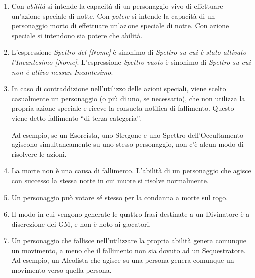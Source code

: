 \documentclass[a4paper,10pt]{article}
\begin{document}
\begin{enumerate}
	
	\item Con \emph{abilità} si intende la capacità di un personaggio vivo di effettuare un'azione speciale di notte. Con \emph{potere} si intende la capacità di un personaggio morto di effettuare un'azione speciale di notte. Con azione speciale si intendono sia potere che abilità.
	
	\item L'espressione \emph{Spettro del [Nome]} è sinonimo di \emph{Spettro su cui è stato attivato l'Incantesimo [Nome]}. L'espressione \emph{Spettro vuoto} è sinonimo di \emph{Spettro su cui non è attivo nessun Incantesimo}.
	
	\item In caso di contraddizione nell'utilizzo delle azioni speciali, viene scelto casualmente un personaggio (o più di uno, se necessario), che non utilizza la propria azione speciale e riceve la consueta notifica di fallimento. Questo viene detto fallimento ``di terza categoria''.
 
	Ad esempio, se un Esorcista, uno Stregone e uno Spettro dell'Occultamento agiscono simultaneamente su uno stesso personaggio, non c'è alcun modo di risolvere le azioni.
	
	\item La morte non è una causa di fallimento. L'abilità di un personaggio che agisce con successo la stessa notte in cui muore si risolve normalmente.
	
	\item Un personaggio può votare sé stesso per la condanna a morte sul rogo.
	
	\item Il modo in cui vengono generate le quattro frasi destinate a un Divinatore è a discrezione dei GM, e non è noto ai giocatori.
	
	\item Un personaggio che fallisce nell'utilizzare la propria abilità genera comunque un movimento, a meno che il fallimento non sia dovuto ad un Sequestratore.
	Ad esempio, un Alcolista che agisce su una persona genera comunque un movimento verso quella persona.
	

\end{enumerate}
\end{document}
